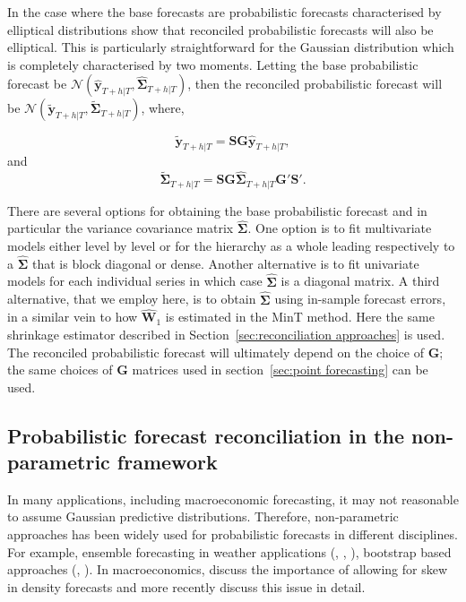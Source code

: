 \documentclass[graybox]{svmult}
\begin{document}
In the case where the base forecasts are probabilistic forecasts characterised by elliptical distributions \cite{Gamakumara2018} show that reconciled probabilistic forecasts will also be elliptical.  This is particularly straightforward for the Gaussian distribution which is completely characterised by two moments.  Letting the base probabilistic forecast be $\mathscr{N}(\bm{\hat{y}}_{T+h|T}, \hat{\bm{\Sigma}}_{T+h|T})$, then the reconciled probabilistic forecast will be $\mathscr{N}(\bm{\tilde{y}}_{T+h|T}, \tilde{\bm{\Sigma}}_{T+h|T})$, where,

\begin{equation}\label{eq:rec mean}
\bm{\tilde{y}}_{T+h|T} = \bm{SG}\bm{\hat{y}}_{T+h|T},
\end{equation}
and
\begin{equation}\label{eq:rec var}
\tilde{\bm{\Sigma}}_{T+h|T} = \bm{SG}\hat{\bm{\Sigma}}_{T+h|T}\bm{G'S'}.
\end{equation}

There are several options for obtaining the base probabilistic forecast and in particular the variance covariance matrix $\hat{\bm{\Sigma}}$.  One option is to fit multivariate models either level by level or for the hierarchy as a whole leading respectively to a $\hat{\bm \Sigma}$ that is block diagonal or dense.  Another alternative is to fit univariate models for each individual series in which case $\hat{\bm{\Sigma}}$ is a diagonal matrix. A third alternative, that we employ here, is to obtain $\hat{\bm{\Sigma}}$ using in-sample forecast errors, in a similar vein to how $\hat{\bm{W}}_{1}$ is estimated in the MinT method.  Here the same shrinkage estimator described in Section~\ref{sec:reconciliation approaches} is used.  The reconciled probabilistic forecast will ultimately depend on the choice of $\bm{G}$; the same choices of $\bm{G}$ matrices used in section~\ref{sec:point forecasting} can be used.

\subsection{Probabilistic forecast reconciliation in the non-parametric framework}\label{sec:probrecnp}

In many applications, including macroeconomic forecasting, it may not reasonable to assume Gaussian predictive distributions. Therefore, non-parametric approaches has been widely used for probabilistic forecasts in different disciplines. For example, ensemble forecasting in weather applications (\cite{Gneiting2005}, \cite{Gneiting2014}, \cite{Gneiting2008}), bootstrap based approaches (\cite{Manzan2008}, \cite{Vilar2013}). In macroeconomics, \cite{CogEtAl2005} discuss the importance of allowing for skew in density forecasts and more recently \cite{SmiVah2016} discuss this issue in detail. 
\end{document}
